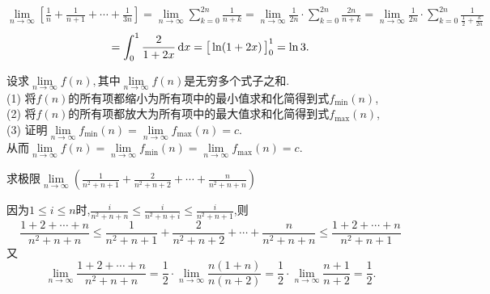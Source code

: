 \solve 
$
\displaystyle
\lim\limits_{n \to \infty}\left[ \frac 1n +\frac {1}{n+1}+\cdots+\frac{1}{3n}\right] 
=\lim\limits_{n \to \infty}\sum_{k=0}^{2n}\frac{1}{n+k}
=\lim\limits_{n \to \infty}\frac{1}{2n}\cdot \sum_{k=0}^{2n}\frac{2n}{n+k}
=\lim\limits_{n \to \infty}\frac{1}{2n}\cdot \sum_{k=0}^{2n}\frac{1}{\frac{1}{2}+\frac{k}{2n}}
$
\[
=\int_{0}^{1}\frac{2}{1+2x}\,{\rm{d}} x=\big[\ln(1+2x)\,\big]_0^1=\ln 3.
\]

\summarize
[
\kg 本题没有给出和式表达式,需要我们自己写成和式的形式,以方便构造积分的形式.\\
\kg 本题中和式的上限不是$n$而是$2n$,那么这个时候整个积分区间就不是被等分成$n$份,而是$2n$份,因此,我们要构造关于变量$\dfrac{i}{2n}$的函数,即
\begin{equation}
\lim\limits_{n \to \infty}\frac{1}{2n}\cdot\sum_{i=1}^{2n}f\left(\frac{i}{2n}\right)
\end{equation}
\kg 积分的上下限由变量$\frac{i}{n}$(本题$\frac{i}{2n}$)的范围所确定,如本题$i =1,2,\ldots,2n,\lim\limits_{n \to \infty}\dfrac{i}{2n}=0,1.$.因此积分的上下限是0,1.
]

\noindent \highlights[2. 夹逼定理法]

\vspace*{1em} \noindent  \hspace*{0.2em}  \hspace{1.5em}
设求$\lim\limits_{n \to \infty}f(n),$其中$\lim\limits_{n \to \infty}f(n)$是无穷多个式子之和.\\[0.5em]
(1) 将$f(n)$的所有项都缩小为所有项中的最小值求和化简得到式$f_{\min}(n)$,\\[0.3em]
(2) 将$f(n)$的所有项都放大为所有项中的最大值求和化简得到式$f_{\max}(n)$,\\[0.3em]
(3) 证明$\lim\limits_{n \to \infty}f_{\min}(n)=\lim\limits_{n \to \infty}f_{\max}(n)=c.$\\[0.5em]
从而$\lim\limits_{n \to \infty}f(n)=\lim\limits_{n \to \infty}f_{\min}(n)=\lim\limits_{n \to \infty}f_{\max}(n)=c.$

\examples 求极限$\displaystyle \lim\limits_{n \to \infty}\left(\frac{1}{n^2+n+1}+\frac{2}{n^2+n+2}+\cdots+\frac{n}{n^2+n+n}\right)$

\solve 因为$1 \le i \le n$时,$\displaystyle \frac{i}{n^2+n+n}\le\frac{i}{n^2+n+i}\le \frac{i}{n^2+n+1}$,则
\[
\frac{1+2+\cdots+n}{n^2+n+n}\le \frac{1}{n^2+n+1}+\frac{2}{n^2+n+2}+\cdots+\frac{n}{n^2+n+n} \le \frac{1+2+\cdots+n}{n^2+n+1}
\]
又
\[
\lim\limits_{n \to \infty}\frac{1+2+\cdots +n}{n^2+n+n}=\frac 12 \cdot \lim\limits_{n \to \infty}\frac{n(1+n)}{n(n+2)}=\frac 12 \cdot \lim\limits_{n \to \infty}\frac{n+1}{n+2}=\frac{1}{2}.
\]

